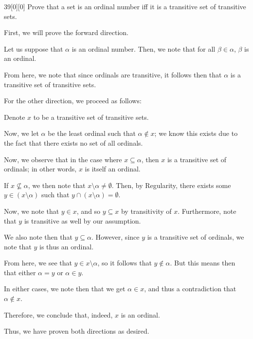\documentclass{article}
\begin{document}
\begin{hw}{39}[0][0]
	Prove that a set is an ordinal number iff it is a transitive set of transitive sets.
\end{hw}
\begin{solution}
	First, we will prove the forward direction.
	\begin{innerproof}
		Let us suppose that $\alpha$ is an ordinal number. Then, we note that for all $\beta \in \alpha$, $\beta$ is an ordinal.
		
		From here, we note that since ordinals are transitive, it follows then that $\alpha$ is a transitive set of transitive sets.
	\end{innerproof}

	For the other direction, we proceed as follows:
	\begin{innerproof}
		Denote $x$ to be a transitive set of transitive sets.
		
		Now, we let $\alpha$ be the least ordinal such that $\alpha \not\in x$; we know this exists due to the fact that there exists no set of all ordinals.
		
		Now, we observe that in the case where $x \subseteq \alpha$, then $x$ is a transitive set of ordinals; in other words, $x$ is itself an ordinal.
		
		If $x \not\subseteq \alpha$, we then note that $x \setminus \alpha \neq \emptyset$. Then, by Regularity, there exists some $y \in (x \setminus \alpha)$ such that $y \cap (x \setminus \alpha) = \emptyset$.
		
		Now, we note that $y \in x$, and so $y \subseteq x$ by transitivity of $x$. Furthermore, note that $y$ is transitive as well by our assumption.
		
		We also note then that $y \subseteq \alpha$. However, since $y$ is a transitive set of ordinals, we note that $y$ is thus an ordinal.
		
		From here, we see that $y \in x \setminus \alpha$, so it follows that $y \not\in \alpha$. But this means then that either $\alpha = y$ or $\alpha \in y$.
		
		In either cases, we note then that we get $\alpha \in x$, and thus a contradiction that $\alpha \not\in x$.
		
		Therefore, we conclude that, indeed, $x$ is an ordinal.
	\end{innerproof}

	Thus, we have proven both directions as desired.
\end{solution}
\end{document}
